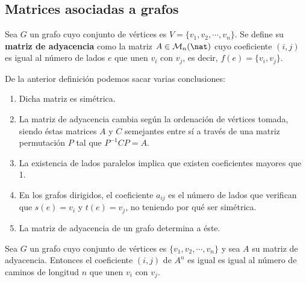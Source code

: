 \subsection{Matrices asociadas a grafos}
\begin{ndef}
    Sea $G$ un grafo cuyo conjunto de vértices es $V = \{v_1,v_2,\cdots, v_n\}$. Se define su \textbf{matriz de adyacencia} como la matriz $A \in \mathcal{M} _n(\nat)$ cuyo coeficiente $(i,j)$ es igual al número de lados $e$ que unen $v_i$ con $v_j$, es decir, $f(e) = \{v_i,v_j\}$.
\end{ndef}

\begin{obs}
    De la anterior definición podemos sacar varias conclusiones:
    \begin{enumerate}
        \item Dicha matriz es simétrica.
        \item La matriz de adyacencia cambia según la ordenación de vértices tomada, siendo éstas matrices $A$ y $C$ semejantes entre sí a través de una matriz permutación $P$ tal que $P^{-1}CP=A$.
        \item La existencia de lados paralelos implica que existen coeficientes mayores que 1.
        \item En los grafos dirigidos, el coeficiente $a_{ij}$ es el número de lados que verifican que $s(e)=v_i$ y $t(e)=v_j$, no teniendo por qué ser simétrica.
        \item La matriz de adyacencia de un grafo determina a éste.
    \end{enumerate}
\end{obs}

\begin{nprop}
    Sea $G$ un grafo cuyo conjunto de vértices es $\{v_1,v_2,\cdots,v_n\}$ y sea $A$ su matriz de adyacencia. Entonces el coeficiente $(i,j)$ de $A^n$ es igual es igual al número de caminos de longitud $n$ que unen $v_i$ con $v_j$.
\end{nprop}

